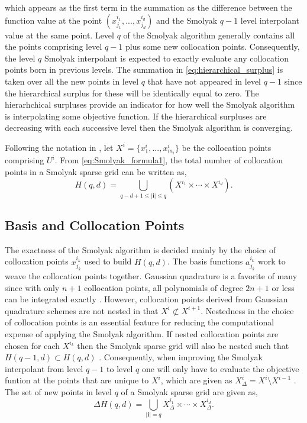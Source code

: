 which appears as the first term in the summation as the difference between the function value at the point $(x_{j_1}^{i_1},...,x_{j_d}^{i_d})$ and the Smolyak $q-1$ level interpolant value at the same point. Level $q$ of the Smolyak algorithm generally contains all the points comprising level $q-1$ plus some new collocation points. Consequently, the level $q$ Smolyak interpolant is expected to exactly evaluate any collocation points born in previous levels. The summation in \ref{eq:hierarchical_surplus} is taken over all the new points in level $q$ that have not appeared in level $q-1$ since the hierarchical surplus for these will be identically equal to zero. The hierarhchical surpluses provide an indicator for how well the Smolyak algorithm is interpolating some objective function. If the hierarchical surpluses are decreasing with each successive level then the Smolyak algorithm is converging.

Following the notation in \cite{NovakRitter}, let $X^i=\lbrace x_1^i,...,x_{m_i}^i\rbrace$ be the collocation points comprising $U^i$. From \ref{eq:Smolyak_formula1}, the total number of collocation points in a Smolyak sparse grid can be written as,
\begin{equation} \label{eq:numer_points_in_smolyak}
    H(q,d) = \bigcup_{q-d+1\leq\vert\textbf{i}\vert\leq q}
     \left(X^{i_1}\times\cdots\times X^{i_d}\right).
\end{equation}     

\subsection{Basis and Collocation Points} \label{subsec:basis_and_points}

The exactness of the Smolyak algorithm is decided mainly by the choice of collocation points $x_{j_k}^{i_k}$ used to build $H(q,d)$. The basis functions $a_{j_k}^{i_k}$ work to weave the collocation points together. Gaussian quadrature is a favorite of many since with only $n+1$ collocation points, all polynomials of degree $2n+1$ or less can be integrated exactly \cite{NumAnyHenrici}. However, collocation points derived from Gaussian quadrature schemes are not nested in that $X^i \not\subset X^{i+1}$. Nestedness in the choice of collocation points is an essential feature for reducing the computational expense of applying the Smolyak algorithm. If nested collocation points are chosen for each $X^{i_k}$ then the Smolyak sparse grid will also be nested such that $H(q-1,d)\subset H(q,d)$ \cite{NovakRitter}. Consequently, when improving the Smolyak interpolant from level $q-1$ to level $q$ one will only have to evaluate the objective funtion at the points that are unique to $X^i$, which are given as $X_{\Delta}^{i} = X^i \setminus X^{i-1}$ \cite{AHSGC}.  The set of new points in level $q$ of a Smolyak sparse grid are given as,
\begin{equation} \label{eq:unique_points_ssg}
    \Delta H(q,d) = \bigcup_{\vert\textbf{i}\vert = q}
     X_{\Delta}^{i_1} \times\cdots\times X_{\Delta}^{i_d}.
\end{equation}   


